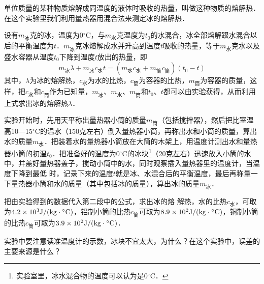 单位质量的某种物质熔解成同温度的液体时吸收的热量，叫做这种物质的熔解热．在这个实验里我们利用量热器用混合法来测定冰的熔解热．

设有$m_{\text{冰}}$克的冰，温度为0$^\circ$C，与$m_{\text{水}}$克温度为$t_0$的水混合，冰全部熔解跟水混合以后的平衡温度为$t$．$m_{\text{冰}}$克冰熔解成水并升高到温度$t$吸收的热量，等于$m_{\text{水}}$克水以及盛水容器从温度$t_0$下降到温度$t$放出的热量，即
\[m_{\text{冰}}\lambda+m_{\text{冰}}c_{\text{水}}t=(m_{\text{水}}c_{\text{水}}+m_{\text{筒}}c_{\text{筒}})(t_0-t)  \]
其中，$\lambda$为冰的熔解热，$c_{\text{水}}$为水的比热，$c_{\text{筒}}$为容器的比热，$m_{\text{筒}}$为容器的质量，这样，把$c_{\text{水}}$和$c_{\text{筒}}$作为已知量，$m_{\text{冰}}$、$m_{\text{水}}$、$m_{\text{筒}}$和$t_0$、$t$都可以由实验获得，从而利用上式求出冰的熔解热$\lambda$．

实验开始时，先用天平称出量热器小筒的质量$m_{\text{筒}}$（包括搅拌器），然后把比室温高10—15$^\circ$C的温水（150克左右）倒入量热器小筒，再称出水和小筒的质量，算出水的质量$m_{\text{水}}$．把装着水的量热器小筒放在大筒的木架上，用温度计测出水和量热器小筒的初温$t_0$．把准备好的温度为0$^\circ$C的冰块\footnote{实验室里，冰水混合物的温度可以认为是0$^\circ$C．}（20克左右）迅速放入小筒的水中，并盖好量热器盖子，搅动小筒中的水，同时观察插入量热器里的温度计，当温度下降到最低
时，记录下来的温度$t$就是冰、水混合后的平衡温度，最后再称量一下量热器小筒和水的质量（其中包括冰的质量），算出冰的质量$m_{\text{冰}}$．

把由实验得到的数据代入第二段中的公式，求出冰的熔
解热，水的比热$c_{\text{水}}$，可取为$4.2\times10^3{\rm J}/({\rm kg}\cdot {}^\circ{\rm C})$，铝制小筒的比热$c_{\text{筒}}$可取为$8.9\times10^2 {\rm J}/({\rm kg}\cdot {}^\circ{\rm C})$，铜制小筒的比热$c_{\text{筒}}$可取为$3.9\times10^2{\rm J}/({\rm kg}\cdot {}^\circ{\rm C})$．

实验中要注意读准温度计的示数，冰块不宜太大，为什么？在这个实验中，误差的主要来源是什么？

